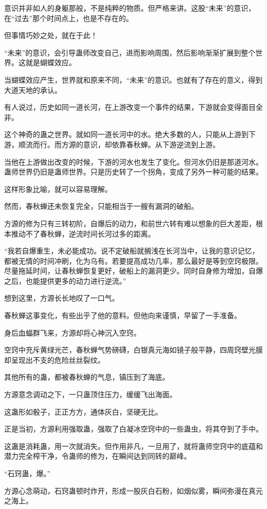 \begin{this_body}
意识并非如人的身躯那般，不是纯粹的物质。但严格来讲。这股“未来”的意识，在“过去”那个时间点上，也是不存在的。

但事情巧妙之处，就在于此！

“未来”的意识，会引导蛊师改变自己，进而影响周围，然后影响渐渐扩展到整个世界。这就是蝴蝶效应。

当蝴蝶效应产生，世界就和原来不同，“未来”的意识。也就有了存在的意义，得到大道天地的承认。

有人说过，历史如同一道长河，在上游改变一个事件的结果，下游就会变得面目全非。

这个神奇的蛊之世界。就如同一道长河中的水。绝大多数的人，只能从上游到下游，顺流而行。而方源的意识，却依靠春秋蝉。从下游逆流到上游。

当他在上游做出改变的时候，下游的河水也发生了变化。但河水仍旧是那道河水。蛊师世界仍旧是蛊师世界。只是历史转了一个拐角，变成了另外一种可能的结果。

这样形象比喻，就可以容易理解。

然而，春秋蝉还未恢复完全，只能相当于一艘有漏洞的破船。

方源的修为只有三转初阶，自爆后的动力，和前世六转有难以想象的巨大差距，根本推动不了春秋蝉，逆流时间长河过多的距离。

“我若自爆重生，未必能成功。说不定破船就搁浅在长河当中，让我的意识记忆，都被无情的时间冲刷，化为乌有。若要提高成功几率，那么最好是等到空窍极限。尽量拖延时间，让春秋蝉恢复更好，破船上的漏洞更少。同时自身修为增加，自爆之后，也能提供更多的动力进行逆流。”

想到这里，方源长长地叹了一口气。

春秋蝉这事变化，有些出乎了他的意料。但他向来谨慎，早留了一手准备。

身后血蝠群飞来，方源却将心神沉入空窍。

空窍中充斥黄绿光芒，春秋蝉气势磅礴，白银真元海如镜子般平静，四周窍壁光膜却呈现出不支的危险丝丝裂纹。

其他所有的蛊，都被春秋蝉的气息，镇压到了海底。

方源意念调动之下，一只蛊顶住压力，缓缓飞出海面。

这蛊形如骰子，正正方方，通体灰白，坚硬无比。

正是当初，方源利用强取蛊，强取了白凝冰空窍中的一些蛊虫，将其夺到了手中。

这蛊是消耗蛊，用一次就消失。但作用非凡，一旦用了，就将蛊师空窍中的底蕴和潜力完全榨干净，令蛊师的修为，在瞬间达到同转的巅峰。

“石窍蛊，爆。”

方源心念萌动，石窍蛊顿时炸开，形成一股灰白石粉，如烟似雾，瞬间弥漫在真元之海上。


\end{this_body}
